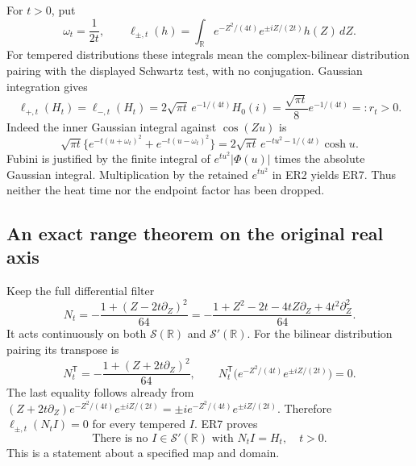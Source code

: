 For \(t>0\), put
\[
 \omega_t=\frac1{2t},\qquad
 \ell_{\pm,t}(h)=\int_{\mathbb R}
 e^{-Z^2/(4t)}e^{\pm iZ/(2t)}h(Z)\,dZ .
 \tag{ER6}
\]
For tempered distributions these integrals mean the complex-bilinear
distribution pairing with the displayed Schwartz test, with no
conjugation. Gaussian integration gives
\[
 \boxed{\ell_{+,t}(H_t)=\ell_{-,t}(H_t)
 =2\sqrt{\pi t}\,e^{-1/(4t)}H_0(i)
 =\frac{\sqrt{\pi t}}8e^{-1/(4t)}=:r_t>0.}
 \tag{ER7}
\]
Indeed the inner Gaussian integral against \(\cos(Zu)\) is
\[
 \sqrt{\pi t}
 \{e^{-t(u+\omega_t)^2}+e^{-t(u-\omega_t)^2}\}
 =2\sqrt{\pi t}\,e^{-tu^2-1/(4t)}\cosh u.
 \tag{ER8}
\]
Fubini is justified by the finite integral of
\(e^{tu^2}|\Phi(u)|\) times the absolute Gaussian integral.
Multiplication by the retained \(e^{tu^2}\) in ER2 yields ER7.
Thus neither the heat time nor the endpoint factor has been dropped.

\subsection{An exact range theorem on the original real axis}

Keep the full differential filter
\[
 N_t=-\frac{1+(Z-2t\partial_Z)^2}{64}
 =-\frac{1+Z^2-2t-4tZ\partial_Z+4t^2\partial_Z^2}{64}.
 \tag{ER9}
\]
It acts continuously on both \(\mathcal S(\mathbb R)\) and
\(\mathcal S'(\mathbb R)\). For the bilinear distribution pairing its
transpose is
\[
 N_t^{\mathsf T}=-\frac{1+(Z+2t\partial_Z)^2}{64},\qquad
 N_t^{\mathsf T}
 \big(e^{-Z^2/(4t)}e^{\pm iZ/(2t)}\big)=0.
 \tag{ER10}
\]
The last equality follows already from
\((Z+2t\partial_Z)e^{-Z^2/(4t)}e^{\pm iZ/(2t)}
 =\pm i e^{-Z^2/(4t)}e^{\pm iZ/(2t)}\).
Therefore \(\ell_{\pm,t}(N_tI)=0\) for every tempered \(I\).
ER7 proves
\[
 \boxed{\text{There is no }I\in\mathcal S'(\mathbb R)
                  \text{ with }N_tI=H_t,\quad t>0.}
 \tag{ER11}
\]
This is a statement about a specified map and domain.

